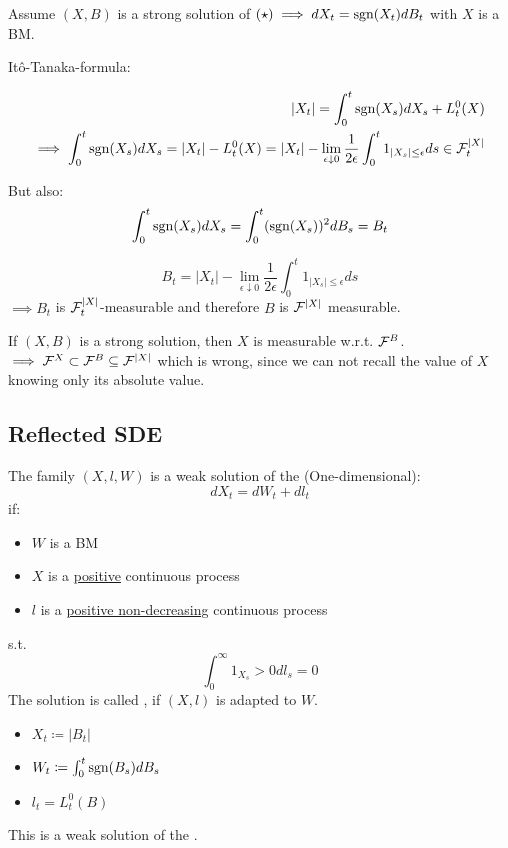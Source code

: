 Assume $(X,B)$ is a strong solution of $(\star)\implies dX_t=\text{sgn}(X_t)dB_t$ with $X$ is a BM. 

Itô-Tanaka-formula:

\begin{align*}
    |X_t|=\int_0^t\text{sgn}(X_s)dX_s+L_t^0(X)\\
    \implies \int_0^t\text{sgn}(X_s)dX_s=|X_t|-L_t^0(X)=|X_t|-\lim_{\epsilon\downarrow 0}\frac{1}{2\epsilon}\int_0^t 1_{|X_s|\leq \epsilon}ds\in \mathcal{F}_t^{|X|}
\end{align*}

But also: 
\begin{align*}
    \int_0^t \text{sgn}(X_s)dX_s = \int_0^t(\text{sgn}(X_s))^2 d B_s=B_t
\end{align*}

\[B_t=|X_t|-\lim_{\epsilon\downarrow 0}\frac{1}{2\epsilon}\int_0^t1_{|X_s|\leq \epsilon}ds\]
$\implies B_t$ is $\mathcal{F}_t^{|X|}$-measurable and therefore $B$ is $\mathcal{F}^{|X|}$ measurable.


If $(X,B)$ is a strong solution, then $X$ is measurable w.r.t. $\mathcal{F}^B$.
$\implies \mathcal{F}^X\subset \mathcal{F}^B\subseteq \mathcal{F}^{|X|}$
which is wrong, since we can not recall the value of $X$ knowing only its absolute value.

\subsection{Reflected SDE}

\begin{definition}\label{def:3.7}
    The family $(X,l,W)$ is a weak solution of the  (One-dimensional):
    \[dX_t=dW_t+dl_t\]
    if: 
    \begin{itemize}
        \item $W$ is a BM 
        \item $X$ is a \underline{positive} continuous process 
        \item $l$ is a \underline{positive non-decreasing} continuous process 
    \end{itemize}
    s.t. 
    \[\int_0^\infty 1_{X_s}>0d l_s=0\]
    The solution is called , if $(X,l)$ is adapted to $W$.
\end{definition}

\begin{aexample}
    \begin{itemize}
        \item $X_t\coloneqq |B_t|$
        \item $W_t\coloneqq \int_0^t\text{sgn}(B_s)dB_s$
        \item $l_t=L_t^0(B)$
    \end{itemize}
    This is a weak solution of the . 
\end{aexample}



